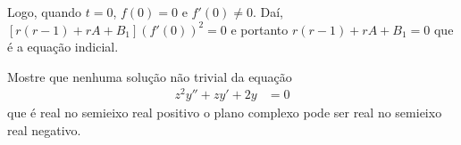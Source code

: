 \documentclass[a4paper,12pt, leqno, answers]{exam}
\begin{document}
\begin{questions}
\begin{solution}
        Logo, quando $t = 0$, $f(0) = 0$ e $f'(0) \neq 0$. Da\'{i}, $\left[ r \left( r - 1 \right) + r A + B_1 \right] \left( f'(0) \right)^2 = 0$ e portanto $r \left( r - 1 \right) + r A + B_1 = 0$ que \'{e} a equa\c{c}\~{a}o indicial.
    \end{solution}

    \question[T3 de 2011] Mostre que nenhuma solu\c{c}\~{a}o n\~{a}o trivial da equa\c{c}\~{a}o
    \begin{align*}
        z^2 y'' + z y' + 2 y &= 0
    \end{align*}
    que \'{e} real no semieixo real positivo o plano complexo pode ser real no semieixo real negativo.
    \begin{solution}
    \end{solution}
\end{questions}
\end{document}
